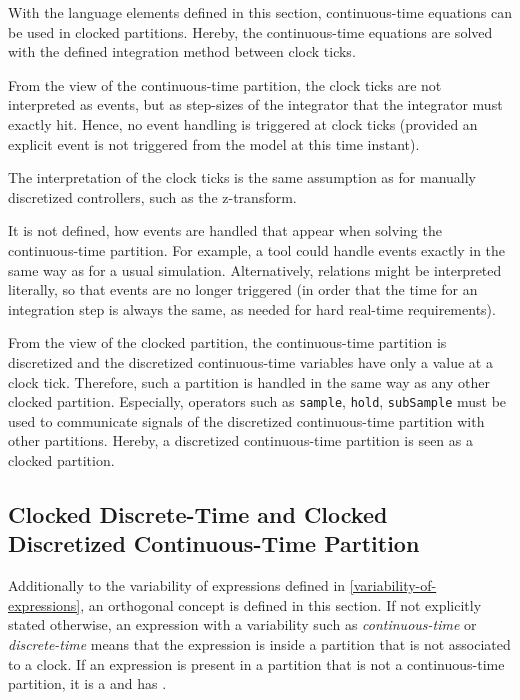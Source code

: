 With the language elements defined in this section, continuous-time
equations can be used in clocked partitions. Hereby, the continuous-time
equations are solved with the defined integration method between clock
ticks.

From the view of the continuous-time partition, the clock ticks are not interpreted as events, but as step-sizes of the integrator that the integrator must exactly hit.
Hence, no event handling is triggered at clock ticks (provided an explicit event is not triggered from the model at this time instant).

\begin{nonnormative}
The interpretation of the clock ticks is the same assumption as for manually discretized controllers, such as the z-transform.
\end{nonnormative}

\begin{nonnormative}
It is not defined, how events are handled that appear when solving the continuous-time partition. For example, a tool could handle events exactly in the same way as for a usual
simulation.  Alternatively, relations might be interpreted literally, so that events are no longer triggered (in order that the time for an integration step is always the same,
as needed for hard real-time requirements).
\end{nonnormative}

From the view of the clocked partition, the continuous-time
partition is discretized and the discretized continuous-time variables
have only a value at a clock tick. Therefore, such a partition is
handled in the same way as any other clocked partition. Especially,
operators such as \lstinline!sample!, \lstinline!hold!, \lstinline!subSample! must be used to communicate
signals of the discretized continuous-time partition with other
partitions. Hereby, a discretized continuous-time partition is seen as a
clocked partition.


\subsection{Clocked Discrete-Time and Clocked Discretized Continuous-Time Partition}\label{clocked-discrete-time-and-clocked-discretized-continuous-time-partition}

Additionally to the variability of expressions defined in \cref{variability-of-expressions}, an orthogonal concept  is defined in this section.
If not explicitly stated otherwise, an expression with a variability such as \emph{continuous-time} or \emph{discrete-time} means that the expression is inside a partition that is not associated to a clock.
If an expression is present in a partition that is not a continuous-time partition, it is a  and has .

